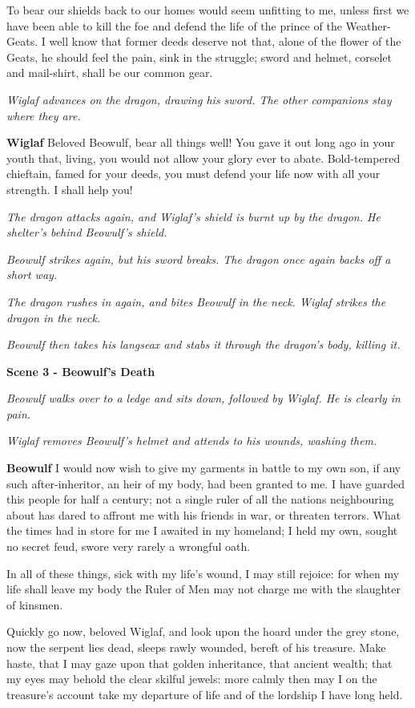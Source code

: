 \documentclass[a4paper]{article}
\begin{document}
{To bear our shields back to our homes
would seem unfitting to me, unless first we have been able
to kill the foe and defend the life
of the prince of the Weather-Geats. I well know
that former deeds deserve not that, alone
of the flower of the Geats, he should feel the pain,
sink in the struggle; sword and helmet,
corselet and mail-shirt, shall be our common gear.

\centerline{\textit{Wiglaf advances on the dragon, drawing his sword. The other companions stay where they are.}}

\textbf{Wiglaf} Beloved Beowulf, bear all things well!
You gave it out long ago in your youth
that, living, you would not allow your glory
ever to abate. Bold-tempered chieftain,
famed for your deeds, you must defend your life now
with all your strength. I shall help you!

\centerline{\textit{The dragon attacks again, and Wiglaf's shield is burnt up by the dragon. He shelter's behind Beowulf's shield.}}
\centerline{\textit{Beowulf strikes again, but his sword breaks. The dragon once again backs off a short way.}}

\centerline{\textit{The dragon rushes in again, and bites Beowulf in the neck. Wiglaf strikes the dragon in the neck.}}
\centerline{\textit{Beowulf then takes his langseax and stabs it through the dragon's body, killing it.}}

\centerline{\textbf{Scene 3 - Beowulf's Death}}
\centerline{\textit{Beowulf walks over to a ledge and sits down, followed by Wiglaf. He is clearly in pain.}}
\centerline{\textit{Wiglaf removes Beowulf's helmet and attends to his wounds, washing them.}}

\textbf{Beowulf} I would now wish to give my garments in battle
to my own son, if any such
after-inheritor, an heir of my body,
had been granted to me. I have guarded this people
for half a century; not a single ruler
of all the nations neighbouring about
has dared to affront me with his friends in war,
or threaten terrors. What the times had in store for me
I awaited in my homeland; I held my own,
sought no secret feud, swore very rarely
a wrongful oath.

In all of these things,
sick with my life’s wound, I may still rejoice:
for when my life shall leave my body
the Ruler of Men may not charge me
with the slaughter of kinsmen.

Quickly go now,
beloved Wiglaf, and look upon the hoard
under the grey stone, now the serpent lies dead,
sleeps rawly wounded, bereft of his treasure.
Make haste, that I may gaze upon that golden inheritance,
that ancient wealth; that my eyes may behold
the clear skilful jewels: more calmly then may I
on the treasure’s account take my departure
of life and of the lordship I have long held.

}
\end{document}

